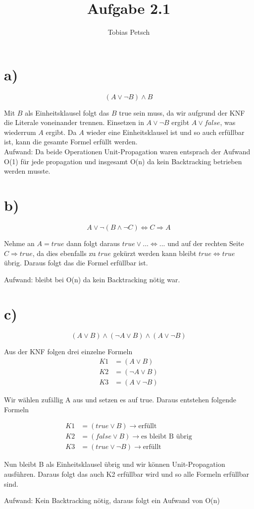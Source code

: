 \documentclass[a4paper,12pt]{article}
\author{Tobias Petsch}
\title{Aufgabe 2.1}
\date{}
\begin{document}
\maketitle


\section*{a)}
\[
(A \lor \neg B) \land B
\]

Mit $B$ als Einheitsklausel folgt das $B$ true sein muss, da wir aufgrund der KNF die Literale
voneinander trennen. Einsetzen in $A \lor \neg B$ ergibt $A \lor false$, was wiederrum $A$ ergibt.
Da $A$ wieder eine Einheitsklausel ist und so auch erfüllbar ist, kann die gesamte Formel erfüllt werden. \\

Aufwand: Da beide Operationen Unit-Propagation waren entsprach der Aufwand O(1) für jede propagation und insgesamt
O(n) da kein Backtracking betrieben werden musste.

\section*{b)}
\[
A \lor \neg (B \land \neg C) \Leftrightarrow C \Rightarrow A
\]

Nehme an $A = true$ dann folgt daraus $true \lor ... \Leftrightarrow ...$ und
auf der rechten Seite $C \Rightarrow true$, da dies ebenfalls zu $true$ gekürzt werden kann 
bleibt $true \Leftrightarrow true$ übrig. Daraus folgt das die Formel erfüllbar ist.

Aufwand: bleibt bei O(n) da kein Backtracking nötig war.

\section*{c)}
\[
(A \lor B) \land (\neg A \lor B) \land (A \lor \neg B)
\]

Aus der KNF folgen drei einzelne Formeln 
\begin{align}
    K1 &= (A \lor B) \\
    K2 &= (\neg A \lor B) \\
    K3 &= (A \lor \neg B)
\end{align}

Wir wählen zufällig A aus und setzen es auf true. Daraus entstehen folgende Formeln

\begin{align}
    K1 &= (true \lor B) \rightarrow \text{erfüllt}\\
    K2 &= (false \lor B) \rightarrow \text{es bleibt B übrig}\\
    K3 &= (true \lor \neg B) \rightarrow \text{erfüllt}
\end{align}

Nun bleibt B als Einheitsklausel übrig und wir können Unit-Propagation ausführen.
Daraus folgt das auch K2 erfüllbar wird und so alle Formeln erfüllbar sind.

Aufwand: Kein Backtracking nötig, daraus folgt ein Aufwand von O(n)
\end{document}
